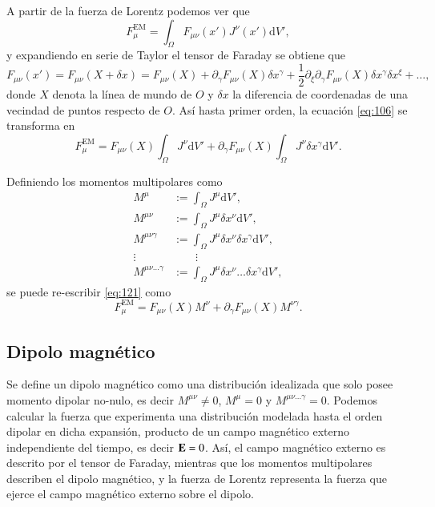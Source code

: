 A partir de la fuerza de Lorentz podemos ver que
\begin{equation}
\label{eq:106}
F^{\mathrm{EM}}_{\mu} = \int_{\Omega} F_{\mu \nu}(x') J^{\nu}(x') \mathrm{d}V',
\end{equation}
y expandiendo en serie de Taylor el tensor de Faraday se obtiene que
\begin{equation}
\label{eq:107}
F_{\mu \nu}(x') = F_{\mu \nu}(X + \delta x) = F_{\mu \nu}(X) +  \partial_{\gamma} F_{\mu \nu}(X) \delta x^{\gamma} +  \frac{1}{2} \partial_{\xi} \partial_{\gamma} F_{\mu \nu}(X) \delta x^{\gamma} \delta x^{\xi} + \dots,
\end{equation}
donde $X$ denota la línea de mundo de $O$ y $\delta x$ la diferencia de coordenadas de una vecindad de puntos respecto de $O$. Así hasta primer orden, la ecuación \eqref{eq:106} se transforma en
\begin{equation}
\label{eq:121}
F^{\mathrm{EM}}_{\mu} = F_{\mu \nu}(X) \int_{\Omega} J^{\nu} \mathrm{d}V' + \partial_{\gamma} F_{\mu \nu}(X) \int_{\Omega} J^{\nu} \delta x^{\gamma} \mathrm{d}V'.
\end{equation}

Definiendo los momentos multipolares como
\begin{align}
\label{eq:108}
M^{\mu} &:= \int_{\Omega} J^{\mu} \mathrm{d}V',\\
\label{eq:109}
M^{\mu \nu} &:= \int_{\Omega} J^{\mu} \delta x^{\nu} \mathrm{d}V',\\
M^{\mu \nu \gamma} &:= \int_{\Omega} J^{\mu} \delta x^{\nu} \delta x^{\gamma} \mathrm{d}V',\\
\vdots & \qquad \vdots \nonumber \\
M^{\mu \nu \dots \gamma} &:= \int_{\Omega} J^{\mu} \delta x^{\nu} \dots \delta x^{\gamma} \mathrm{d}V',
\end{align}
se puede re-escribir \eqref{eq:121} como
\begin{equation}
F^{\mathrm{EM}}_{\mu} = F_{\mu \nu}(X) M^{\nu} + \partial_{\gamma} F_{\mu \nu}(X) M^{\nu \gamma}.
\end{equation}


\subsection{Dipolo magnético}

Se define un dipolo magnético como una distribución idealizada que solo posee momento dipolar no-nulo, es decir $M^{\mu \nu} \neq 0$, $M^{\mu} = 0$ y $M^{\mu \nu \dots \gamma} = 0$. Podemos calcular la fuerza que experimenta una distribución modelada hasta el orden dipolar en dicha expansión, producto de un campo magnético externo independiente del tiempo, es decir $\vb{E}=0$. Así, el campo magnético externo es descrito por el tensor de Faraday, mientras que los momentos multipolares describen el dipolo magnético, y la fuerza de Lorentz representa la fuerza que ejerce el campo magnético externo sobre el dipolo.

